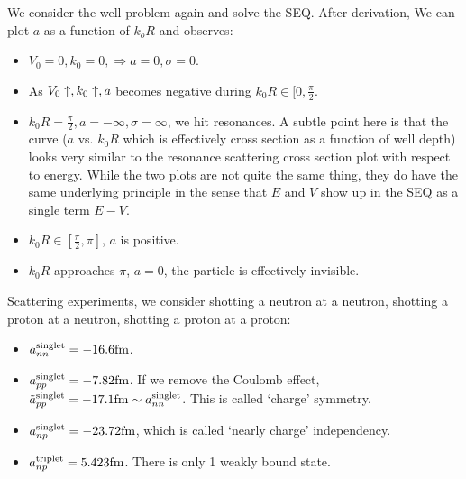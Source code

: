 \documentclass{school-22.101-notes}
\begin{document}
We consider the well problem again and solve the SEQ. After derivation,  
We can plot $a$ as a function of $k_o R$ and observes: 
\begin{itemize}
\item $V_0 = 0, k_0 = 0, \Rightarrow a= 0 ,\sigma = 0$. 
\item As $V_0 \uparrow, k_0 \uparrow, a$ becomes negative during $k_0 R \in [0, \frac{\pi}{2}$. 
\item $k_0 R = \frac{\pi}{2}, a = -\infty, \sigma = \infty$, we hit resonances. A subtle point here is that the curve ($a$ vs. $k_0 R$ which is effectively cross section as a function of well depth) looks very similar to the resonance scattering cross section plot with respect to energy. While the two plots are not quite the same thing, they do have the same underlying principle in the sense that $E$ and $V$ show up in the SEQ as a single term $E-V$.  
\item $k_0 R \in [\frac{\pi}{2}, \pi]$, $a$ is positive. 
\item $k_0 R$ approaches $\pi$, $a = 0$, the particle is effectively invisible. 
\end{itemize}


Scattering experiments, we consider shotting a neutron at a neutron, shotting a proton at a neutron, shotting a proton at a proton: 
\begin{itemize}
\item $\displaystyle a^{\mathrm{singlet}}_{nn} = -16.6 \mathrm{fm}$. 
\item $\displaystyle a^{\mathrm{singlet}}_{pp} = -7.82 \mathrm{fm}$. If we remove the Coulomb effect, $\displaystyle \tilde{a}^{\mathrm{singlet}}_{pp} = -17.1 \mathrm{fm} \sim a^{\mathrm{singlet}}_{nn}$. This is called `charge' symmetry. 
\item $\displaystyle a^{\mathrm{singlet}}_{np} = -23.72 \mathrm{fm}$, which is called `nearly charge' independency. 
\item $\displaystyle a^{\mathrm{triplet}}_{np} = 5.423 \mathrm{fm}$. There is only 1 weakly bound state. 
\end{itemize}
\end{document}
